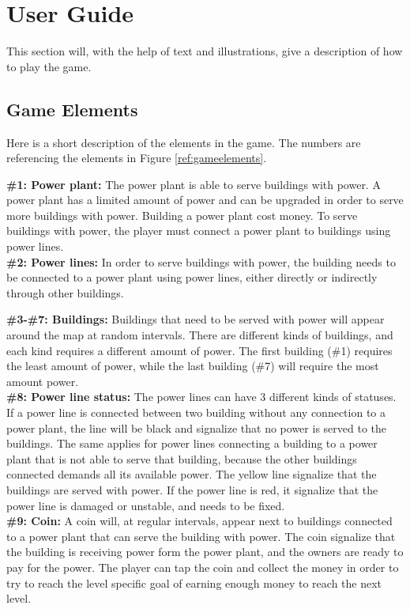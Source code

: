 \chapter{User Guide}

This section will, with the help of text and illustrations, give a description of how to play the game. 

\clearpage

\section*{Game Elements}
	Here is a short description of the elements in the game. The numbers are referencing the elements in
	Figure \ref{ref:gameelements}.

	{\bf \#1: Power plant:} The power plant is able to serve buildings with power.
	A power plant has a limited amount of power and can be upgraded
	in order to serve more buildings with power. Building a power plant cost money.
	To serve buildings with power, the player must connect a power plant to
	buildings using power lines. \\
	
	{\bf \#2: Power lines: } In order to serve buildings with power, the building needs 
	to be connected to a power plant using power lines, either directly or indirectly 
	through other buildings.

	
	{\bf \#3-\#7: Buildings: } Buildings that need to be served with power will appear 
	around the map at random intervals. There are different kinds of buildings, and each 
	kind requires a different amount of power. The first building (\#1) requires the least 
	amount of power, while the last building (\#7) will require the most amount power. \\
	
	{\bf \#8: Power line status:} The power lines can have 3 different kinds of statuses.
	If a power line is connected between two building without any connection
	to a power plant, the line will be black and signalize that no power is served
	to the buildings. The same applies for power lines connecting a building to a power 
	plant that is not able to serve that building, because the other buildings connected 
	demands all its available power. The yellow line signalize that the buildings are served 
	with power. If the power line is red, it signalize that the power 
	line is damaged or unstable, and needs to be fixed. \\ 
	
	{\bf \#9: Coin:} A coin will, at regular intervals, appear next to buildings connected to
	a power plant that can serve the building with power. The coin signalize that the building 
	is receiving power form the power plant, and the owners are ready to pay for the power. The player
	can tap the coin and collect the money in order to try to reach the level specific goal of earning 
	enough money to reach the next level.

